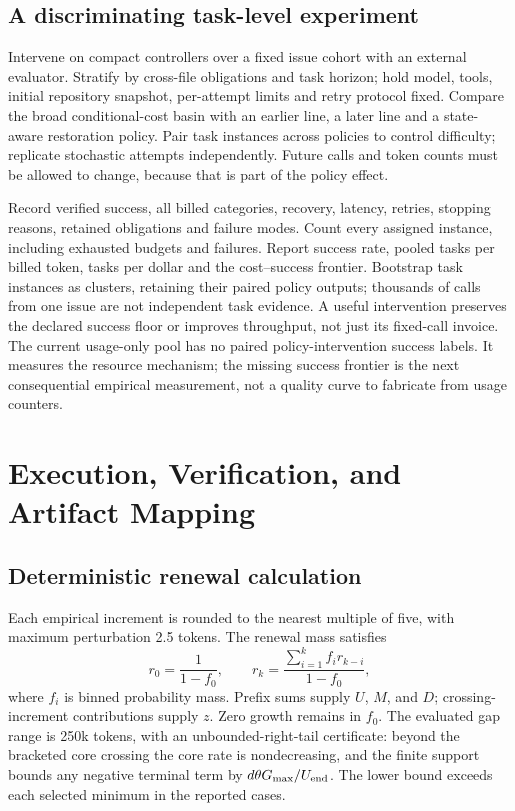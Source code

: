 \documentclass[sigconf,screen,nonacm]{acmart}
\begin{document}
\subsection{A discriminating task-level experiment}
Intervene on compact controllers over a fixed issue cohort with an
external evaluator. Stratify by cross-file obligations and task horizon;
hold model, tools, initial repository snapshot, per-attempt limits and
retry protocol fixed. Compare the broad conditional-cost basin with an
earlier line, a later line and a state-aware restoration policy.
Pair task instances across policies to control difficulty; replicate
stochastic attempts independently. Future calls and token counts must be
allowed to change, because that is part of the policy effect.

Record verified success, all billed categories, recovery, latency,
retries, stopping reasons, retained obligations and failure modes.
Count every assigned instance, including exhausted budgets and failures.
Report success rate, pooled tasks per billed token, tasks per dollar and
the cost--success frontier. Bootstrap task instances as clusters, retaining
their paired policy outputs; thousands of calls from one issue are not
independent task evidence. A useful intervention preserves the declared
success floor or improves throughput, not just its fixed-call invoice.
The current usage-only pool has no paired policy-intervention success
labels. It measures the resource mechanism; the missing success frontier
is the next consequential empirical measurement, not a quality curve
to fabricate from usage counters.

\section{Execution, Verification, and Artifact Mapping}
\label{app:execution}

\subsection{Deterministic renewal calculation}
Each empirical increment is rounded to the nearest multiple of five, with
maximum perturbation 2.5 tokens. The renewal mass satisfies
\begin{equation}
r_0=\frac{1}{1-f_0},\qquad
r_k=\frac{\sum_{i=1}^k f_i r_{k-i}}{1-f_0},
\end{equation}
where $f_i$ is binned probability mass. Prefix sums supply $U$, $M$, and $D$;
crossing-increment contributions supply $z$. Zero growth remains in $f_0$.
The evaluated gap range is 250k tokens, with an unbounded-right-tail
certificate: beyond the bracketed core crossing the core rate is
nondecreasing, and the finite support bounds any negative terminal term
by $d\theta G_{\max}/U_{\rm end}$. The lower bound exceeds each selected
minimum in the reported cases.
\end{document}
